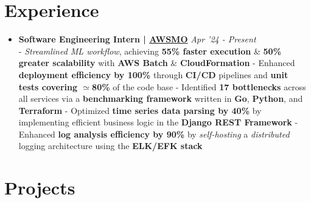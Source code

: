 \documentclass[a4paper,10pt]{extarticle} %
\begin{document}
\section{\textcolor{primary}{Experience}}
\vspace{+0.1cm}

\begin{itemize}[leftmargin=0.55cm, rightmargin=0.2cm, label={\Large\textbullet}]

\item \textbf{Software Engineering Intern | \href{https://awsmo.ai/}{AWSMO}} \hfill{\textit{Apr '24 - Present}} \\
- \textit{Streamlined ML workflow}, achieving \textbf{55\% faster execution} \& \textbf{50\% greater scalability} with \textbf{AWS Batch} \& \textbf{CloudFormation} \newline
- Enhanced \textbf{deployment efficiency by 100\%} through \textbf{CI/CD} pipelines and \textbf{unit tests covering $\simeq$80\%} of the code base \newline
- Identified \textbf{17 bottlenecks} across all services via a \textbf{benchmarking framework} written in \textbf{Go}, \textbf{Python}, and \textbf{Terraform} \newline
- Optimized \textbf{time series data parsing by 40\%} by implementing efficient business logic in the \textbf{Django REST Framework} \newline
- Enhanced \textbf{log analysis efficiency by 90\%} by \textit{self-hosting} a \textit{distributed} logging architecture using the \textbf{ELK/EFK stack}

\end{itemize}


 \vspace{0.2cm}
\section{\textcolor{primary}{Projects}}
 \vspace{0.1cm}
\end{document}
